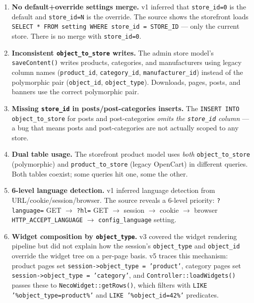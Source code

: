 \documentclass[11pt,a4paper]{article}
\begin{document}
\begin{enumerate}[leftmargin=1.6em,itemsep=2pt]
  \item \textbf{No default+override settings merge.} v1 inferred that
        \texttt{store\_id=0} is the default and \texttt{store\_id=N} is
        the override. The source shows the storefront loads
        \texttt{SELECT * FROM setting WHERE store\_id = STORE\_ID} ---
        only the current store. There is no merge with \texttt{store\_id=0}.
  \item \textbf{Inconsistent \texttt{object\_to\_store} writes.} The
        admin store model's \texttt{saveContent()} writes products,
        categories, and manufacturers using legacy column names
        (\texttt{product\_id}, \texttt{category\_id},
        \texttt{manufacturer\_id}) instead of the polymorphic pair
        (\texttt{object\_id}, \texttt{object\_type}). Downloads, pages,
        posts, and banners use the correct polymorphic pair.
  \item \textbf{Missing \texttt{store\_id} in posts/post-categories
        inserts.} The \texttt{INSERT INTO object\_to\_store} for posts
        and post-categories \emph{omits the \texttt{store\_id} column} ---
        a bug that means posts and post-categories are not actually
        scoped to any store.
  \item \textbf{Dual table usage.} The storefront product model uses
        \emph{both} \texttt{object\_to\_store} (polymorphic) and
        \texttt{product\_to\_store} (legacy OpenCart) in different
        queries. Both tables coexist; some queries hit one, some the
        other.
  \item \textbf{6-level language detection.} v1 inferred language
        detection from URL/cookie/session/browser. The source reveals a
        6-level priority: \texttt{?language=} GET $\to$ \texttt{?hl=}
        GET $\to$ session $\to$ cookie $\to$ browser
        \texttt{HTTP\_ACCEPT\_LANGUAGE} $\to$ \texttt{config\_language}
        setting.
  \item \textbf{Widget composition by \texttt{object\_type}.} v3 covered
        the widget rendering pipeline but did not explain how the
        session's \texttt{object\_type} and \texttt{object\_id} override
        the widget tree on a per-page basis. v5 traces this mechanism:
        product pages set \texttt{session->object\_type = 'product'},
        category pages set \texttt{session->object\_type = 'category'},
        and \texttt{Controller::loadWidgets()} passes these to
        \texttt{NecoWidget::getRows()}, which filters with
        \texttt{LIKE '\%object\_type=product\%'} and
        \texttt{LIKE '\%object\_id=42\%'} predicates.
\end{enumerate}
\end{document}
